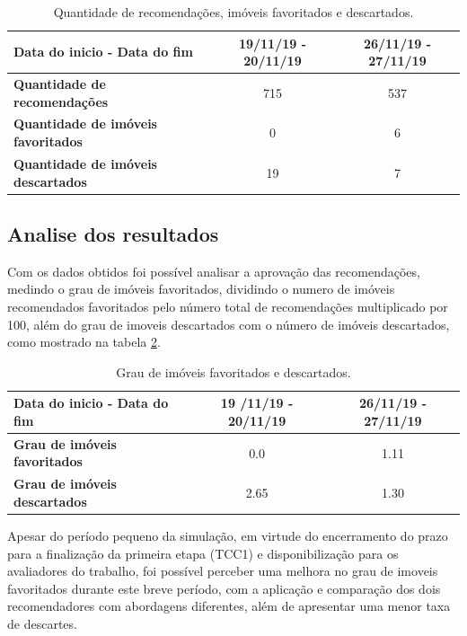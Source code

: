 \begin{apendicesenv}
\begin{table}[H]
\centering
\caption[Quantidade de recomendações, imóveis favoritados e descartados]{Quantidade de recomendações, imóveis favoritados e descartados.}
\begin{tabular}{lcc}
\hline
\textbf{Data do inicio - Data do fim} & 19/11/19 - 20/11/19 & 26/11/19 - 27/11/19 \\ \hline
\textbf{Quantidade de recomendações} & 715 & 537 \\ \hline
\textbf{Quantidade de imóveis favoritados} & 0 & 6 \\ \hline
\textbf{Quantidade de imóveis descartados} & 19 & 7 \\ \hline
\end{tabular}
\label{tab:my-table}
\end{table}



\subsection{Analise dos resultados}

Com os dados obtidos foi possível analisar a aprovação das recomendações, medindo o grau de imóveis favoritados, dividindo o numero de imóveis recomendados favoritados pelo número total de recomendações multiplicado por 100, além do grau de imoveis descartados com o número de imóveis descartados, como mostrado na tabela \ref{tab:my-table2}.

\begin{table}[H]
\centering
\caption[Grau de imóveis favoritados e descartados]{Grau de imóveis favoritados e descartados.}
\begin{tabular}{lcc}
\hline
\textbf{Data do inicio - Data do fim} & 19 /11/19 - 20/11/19 & 26/11/19 - 27/11/19 \\ \hline
\textbf{Grau de imóveis favoritados} & 0.0 & 1.11 \\ \hline
\textbf{Grau de imóveis descartados} & 2.65 & 1.30 \\ \hline
\end{tabular}
\label{tab:my-table2}
\end{table}

Apesar do período pequeno da simulação, em virtude do encerramento do prazo para a finalização da primeira etapa (TCC1) e disponibilização para os avaliadores do trabalho, foi possível perceber uma melhora no grau de imoveis favoritados durante este breve período, com a aplicação e comparação dos dois recomendadores com abordagens diferentes, além de apresentar uma menor taxa de descartes.

\end{apendicesenv}